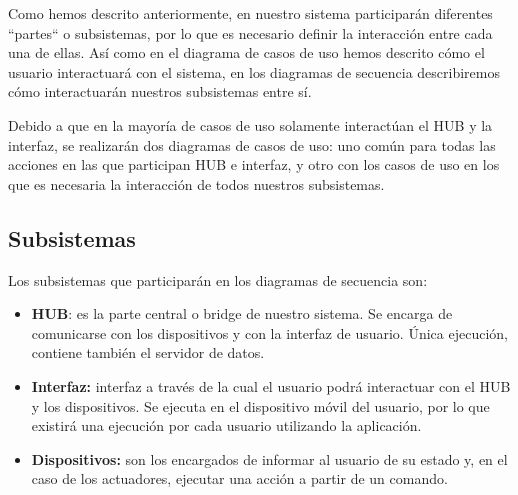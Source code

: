 Como hemos descrito anteriormente, en nuestro sistema participarán diferentes ``partes`` o subsistemas, por lo que es necesario definir la interacción entre cada
una de ellas. Así como en el diagrama de casos de uso hemos descrito cómo el usuario interactuará con el sistema, en los diagramas de secuencia describiremos
cómo interactuarán nuestros subsistemas entre sí.
\par
Debido a que en la mayoría de casos de uso solamente interactúan el HUB y la interfaz, se realizarán dos diagramas de casos de uso: uno común para todas las acciones
en las que participan HUB e interfaz, y otro con los casos de uso en los que es necesaria la interacción de todos nuestros subsistemas.
\subsection{Subsistemas}
Los subsistemas que participarán en los diagramas de secuencia son:
\begin{itemize}
\item\textbf{HUB}: es la parte central o bridge de nuestro sistema. Se encarga de comunicarse con los dispositivos y con la interfaz de usuario. Única ejecución, contiene también
el servidor de datos.
\item\textbf{Interfaz:} interfaz a través de la cual el usuario podrá interactuar con el HUB y los dispositivos. Se ejecuta en el dispositivo móvil del usuario, por lo 
que existirá una ejecución por cada usuario utilizando la aplicación.
\item\textbf{Dispositivos:} son los encargados de informar al usuario de su estado y, en el caso de los actuadores, ejecutar una acción a partir de un comando.
\end{itemize}
